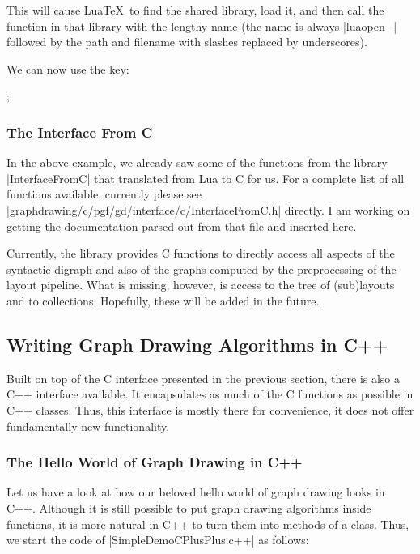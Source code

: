 This will cause Lua\TeX\ to find the shared library, load it, and then
call the function in that library with the lengthy name (the name is
always |luaopen_| followed by the path and filename with slashes
replaced by underscores). 

We can now use the key:

\begin{codeexample}[]
\tikz {};
\end{codeexample}

\subsubsection{The Interface From C}

In the above example, we already saw some of the functions from the
library |InterfaceFromC| that translated from Lua to C for us. For a
complete list of all functions available, currently please see
|graphdrawing/c/pgf/gd/interface/c/InterfaceFromC.h| directly. I am
working on getting the documentation parsed out from that file and
inserted here.

Currently, the library provides C functions to directly access all
aspects of the syntactic digraph and also of the graphs computed by
the preprocessing of the layout pipeline. What is missing, however, is
access to the tree of (sub)layouts and to collections. Hopefully, these will
be added in the future. 




\subsection{Writing Graph Drawing Algorithms in C++}

\label{section-gd-c++}

Built on top of the C interface presented in the previous section,
there is also a C++ interface available. It encapsulates as much of
the C functions as possible in C++ classes. Thus, this interface is
mostly there for convenience, it does not offer fundamentally new
functionality.


\subsubsection{The Hello World of Graph Drawing in C++}

Let us have a look at how our beloved hello world of graph drawing
looks in C++. Although it is still possible to put graph drawing
algorithms inside functions, it is more natural in C++ to turn them
into methods of a class. Thus, we start the code of
|SimpleDemoCPlusPlus.c++| as follows:

